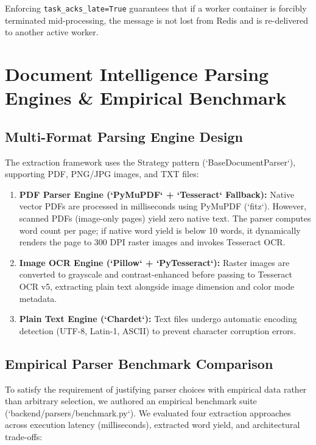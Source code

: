 \documentclass[peerreviewca]{IEEEtran}
\begin{document}
Enforcing \texttt{task\_acks\_late=True} guarantees that if a worker container is forcibly terminated mid-processing, the message is not lost from Redis and is re-delivered to another active worker.

\section{Document Intelligence Parsing Engines \& Empirical Benchmark}
\label{sec:intelligence}

\subsection{Multi-Format Parsing Engine Design}
The extraction framework uses the Strategy pattern (`BaseDocumentParser`), supporting PDF, PNG/JPG images, and TXT files:

\begin{enumerate}
    \item \textbf{PDF Parser Engine (`PyMuPDF` + `Tesseract` Fallback):} Native vector PDFs are processed in milliseconds using PyMuPDF (`fitz`). However, scanned PDFs (image-only pages) yield zero native text. The parser computes word count per page; if native word yield is below 10 words, it dynamically renders the page to 300 DPI raster images and invokes Tesseract OCR.
    \item \textbf{Image OCR Engine (`Pillow` + `PyTesseract`):} Raster images are converted to grayscale and contrast-enhanced before passing to Tesseract OCR v5, extracting plain text alongside image dimension and color mode metadata.
    \item \textbf{Plain Text Engine (`Chardet`):} Text files undergo automatic encoding detection (UTF-8, Latin-1, ASCII) to prevent character corruption errors.
\end{enumerate}

\subsection{Empirical Parser Benchmark Comparison}
To satisfy the requirement of justifying parser choices with empirical data rather than arbitrary selection, we authored an empirical benchmark suite (`backend/parsers/benchmark.py`). We evaluated four extraction approaches across execution latency (milliseconds), extracted word yield, and architectural trade-offs:
\end{document}
